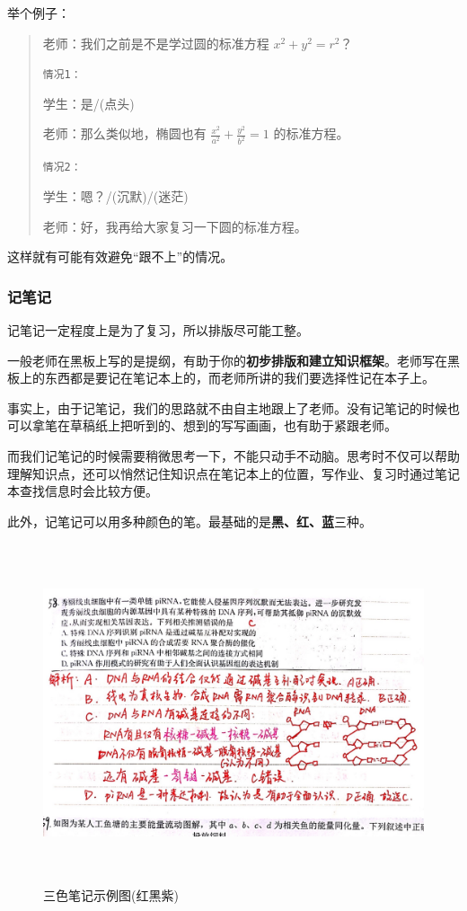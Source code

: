 \documentclass[UTF8,11pt,a4paper]{ctexart}
\begin{document}
				举个例子：
				
				\begin{quote}
					老师：我们之前是不是学过圆的标准方程 $x^2+y^2=r^2$？
					
					\texttt{情况1：}
					
					学生：是/(点头)
					
					老师：那么类似地，椭圆也有 $\frac{x^2}{a^2}+\frac{y^2}{b^2}=1$ 的标准方程。
					
					\texttt{情况2：}
					
					学生：嗯？/(沉默)/(迷茫)
					
					老师：好，我再给大家复习一下圆的标准方程。
					
				\end{quote}
			
				这样就有可能有效避免“跟不上”的情况。
			\subsubsection{记笔记}
				记笔记一定程度上是为了复习，所以排版尽可能工整。
				
				一般老师在黑板上写的是提纲，有助于你的\textbf{初步排版和建立知识框架}。老师写在黑板上的东西都是要记在笔记本上的，而老师所讲的我们要选择性记在本子上。
				
				事实上，由于记笔记，我们的思路就不由自主地跟上了老师。没有记笔记的时候也可以拿笔在草稿纸上把听到的、想到的写写画画，也有助于紧跟老师。
				
				而我们记笔记的时候需要稍微思考一下，不能只动手不动脑。思考时不仅可以帮助理解知识点，还可以悄然记住知识点在笔记本上的位置，写作业、复习时通过笔记本查找信息时会比较方便。
				
				此外，记笔记可以用多种颜色的笔。最基础的是\textbf{黑、{\color{red}红}、{\color{blue}蓝}}三种。
				
				\begin{figure}[h]
					\centering
					\includegraphics[width=14cm,height=10cm]{IMG_3110.JPG}
					
					\caption{三色笔记示例图({\color{red}红}黑{\color{magenta}紫})}
				\end{figure}
\end{document}
